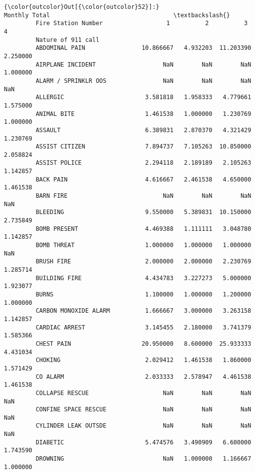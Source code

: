 \documentclass[11pt]{article}
\begin{document}
\begin{Verbatim}[commandchars=\\\{\}]
{\color{outcolor}Out[{\color{outcolor}52}]:}                           Monthly Total                                   \textbackslash{}
         Fire Station Number                  1          2          3          4    
         Nature of 911 call                                                         
         ABDOMINAL PAIN                10.866667   4.932203  11.203390   2.250000   
         AIRPLANE INCIDENT                   NaN        NaN        NaN   1.000000   
         ALARM / SPRINKLR OOS                NaN        NaN        NaN        NaN   
         ALLERGIC                       3.581818   1.958333   4.779661   1.575000   
         ANIMAL BITE                    1.461538   1.000000   1.230769   1.000000   
         ASSAULT                        6.389831   2.870370   4.321429   1.230769   
         ASSIST CITIZEN                 7.894737   7.105263  10.850000   2.058824   
         ASSIST POLICE                  2.294118   2.189189   2.105263   1.142857   
         BACK PAIN                      4.616667   2.461538   4.650000   1.461538   
         BARN FIRE                           NaN        NaN        NaN        NaN   
         BLEEDING                       9.550000   5.389831  10.150000   2.735849   
         BOMB PRESENT                   4.469388   1.111111   3.048780   1.142857   
         BOMB THREAT                    1.000000   1.000000   1.000000        NaN   
         BRUSH FIRE                     2.000000   2.000000   2.230769   1.285714   
         BUILDING FIRE                  4.434783   3.227273   5.000000   1.923077   
         BURNS                          1.100000   1.000000   1.200000   1.000000   
         CARBON MONOXIDE ALARM          1.666667   3.000000   3.263158   1.142857   
         CARDIAC ARREST                 3.145455   2.180000   3.741379   1.585366   
         CHEST PAIN                    20.950000   8.600000  25.933333   4.431034   
         CHOKING                        2.029412   1.461538   1.860000   1.571429   
         CO ALARM                       2.033333   2.578947   4.461538   1.461538   
         COLLAPSE RESCUE                     NaN        NaN        NaN        NaN   
         CONFINE SPACE RESCUE                NaN        NaN        NaN        NaN   
         CYLINDER LEAK OUTSDE                NaN        NaN        NaN        NaN   
         DIABETIC                       5.474576   3.490909   6.600000   1.743590   
         DROWNING                            NaN   1.000000   1.166667   1.000000   

\end{Verbatim}
\end{document}
